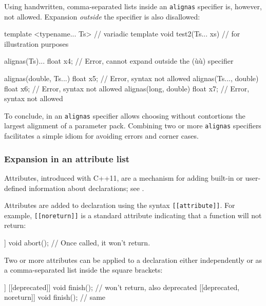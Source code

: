 Using handwritten, comma-separated lists inside an \lstinline!alignas!
specifier is, however, not allowed. Expansion \emph{outside} the
specifier is also disallowed:

\begin{emcppslisting}[emcppsbatch=e31]
template <typename... Ts>    // variadic template
void test2(Ts... xs)          // for illustration purposes
{
    alignas(Ts)... float x4;
        // Error, cannot expand outside the (ù{}ù) specifier

    alignas(double, Ts...) float x5; // Error, syntax not allowed
    alignas(Ts..., double) float x6; // Error, syntax not allowed
    alignas(long, double) float x7;  // Error, syntax not allowed
}
\end{emcppslisting}
    

\noindent To conclude,  in an \lstinline!alignas! specifier
allows choosing without contortions the largest alignment of a parameter
pack. Combining two or more \lstinline!alignas! specifiers facilitates a
simple idiom for avoiding errors and corner cases.

\subsubsection[Expansion in an attribute list]{Expansion in an attribute list}\label{expansion-in-an-attribute-list}

Attributes, introduced with C++11, are a mechanism for adding built-in
or user-defined information about declarations; see
.

Attributes are added to declaration using the syntax
\lstinline![[attribute]]!. For example,\linebreak%
 \lstinline![[noreturn]]! is a standard
attribute indicating that a function will not return:

\begin{emcppslisting}
[[noreturn]] void abort();  // Once called, it won't return.
\end{emcppslisting}
    
\noindent Two or more attributes can be applied to a declaration either
independently or as a comma-separated list inside the square brackets:

\begin{emcppslisting}[emcppsstandards={c++14}]
[[noreturn]] [[deprecated]] void finish();  // won't return, also deprecated
[[deprecated, noreturn]]    void finish();  // same
\end{emcppslisting}
    

